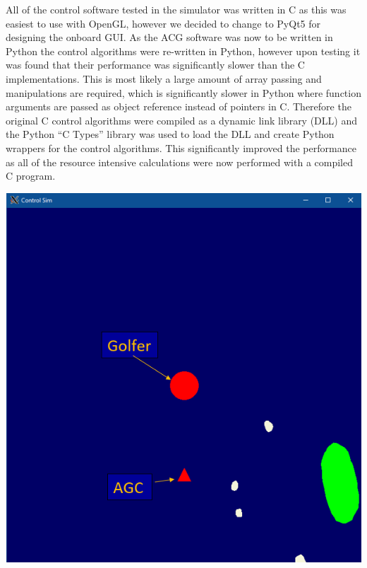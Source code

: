\documentclass[11pt,landscape]{article}
\newenvironment{Figure}
  {\par\medskip\noindent\minipage{\linewidth}}
  {\endminipage\par\medskip}
\begin{document}
\begin{multicols}{3}
All of the control software tested in the simulator was written in C as this was
easiest to use with OpenGL, however we decided to change to PyQt5 for designing
the onboard GUI. As the ACG software was now to be written in Python the control
algorithms were re-written in Python, however upon testing it was found that
their performance was significantly slower than the C implementations. This is
most likely a large amount of array passing and manipulations are required,
which is significantly slower in Python where function arguments are passed as
object reference instead of pointers in C. Therefore the original C control
algorithms were compiled as a dynamic link library (DLL) and the Python ``C
Types'' library was used to load the DLL and create Python wrappers for the
control algorithms. This significantly improved the performance as all of the
resource intensive calculations were now performed with a compiled C program.

\begin{Figure}
    \begin{center}
        \includegraphics[width=\textwidth]{simulator.png}
    \end{center}
    \label{fig:simulator}
\end{Figure}


\end{multicols}
\end{document}

